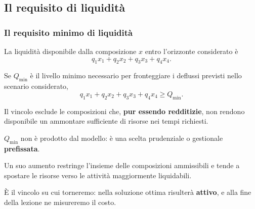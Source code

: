



\subsection{Il requisito di liquidit\`{a}}%

\begin{frame}%
%

\frametitle{Il requisito minimo di liquidit\`{a}}%
%

%


La liquidit\`{a} disponibile dalla composizione $x$ entro l'orizzonte
considerato \`{e}
\[
q_{1}x_{1}+q_{2}x_{2}+q_{3}x_{3}+q_{4}x_{4}.
\]


Se $Q_{\min}$ \`{e} il livello minimo necessario per fronteggiare i deflussi
previsti nello scenario considerato,
\[
q_{1}x_{1}+q_{2}x_{2}+q_{3}x_{3}+q_{4}x_{4}\geq Q_{\min}.
\]


\medskip

\begin{stepitemize}
\item Il vincolo esclude le composizioni che, \textbf{pur essendo redditizie},
non rendono disponibile un ammontare sufficiente di risorse nei tempi richiesti.

\item $Q_{\min}$ non \`{e} prodotto dal modello: \`{e} una scelta prudenziale
o gestionale \textbf{prefissata}.

\item Un suo aumento restringe l'insieme delle composizioni ammissibili e
tende a spostare le risorse verso le attivit\`{a} maggiormente liquidabili.
\end{stepitemize}

\medskip

\begin{center}
{\small \`{E} il vincolo su cui torneremo: nella soluzione ottima
risulter\`{a} \textbf{attivo}, e alla fine della lezione ne misureremo il
costo.}
\end{center}

%

\transboxout
\end{frame}%


